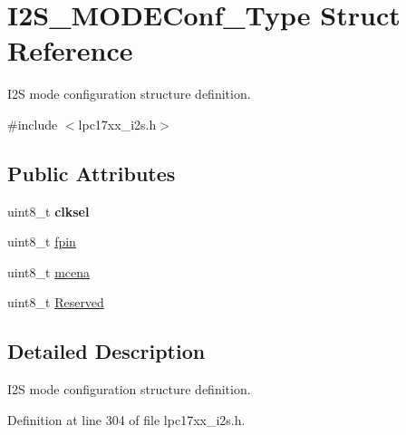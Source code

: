 \hypertarget{struct_i2_s___m_o_d_e_conf___type}{\section{\-I2\-S\-\_\-\-M\-O\-D\-E\-Conf\-\_\-\-Type \-Struct \-Reference}
\label{struct_i2_s___m_o_d_e_conf___type}
}


\-I2\-S mode configuration structure definition.  




{\ttfamily \#include $<$lpc17xx\-\_\-i2s.\-h$>$}

\subsection*{\-Public \-Attributes}
\begin{DoxyCompactItemize}
\item 
\hypertarget{struct_i2_s___m_o_d_e_conf___type_a3f368aed17842afec03e414db9aa68fc}{uint8\-\_\-t {\bfseries clksel}}\label{struct_i2_s___m_o_d_e_conf___type_a3f368aed17842afec03e414db9aa68fc}

\item 
uint8\-\_\-t \hyperlink{struct_i2_s___m_o_d_e_conf___type_a2def5f397a120304356ac08f927c3751}{fpin}
\item 
uint8\-\_\-t \hyperlink{struct_i2_s___m_o_d_e_conf___type_a5b19284e04f77360ba075d068a41a420}{mcena}
\item 
uint8\-\_\-t \hyperlink{struct_i2_s___m_o_d_e_conf___type_abaab05449c36f69dce46351edf867d62}{\-Reserved}
\end{DoxyCompactItemize}


\subsection{\-Detailed \-Description}
\-I2\-S mode configuration structure definition. 

\-Definition at line 304 of file lpc17xx\-\_\-i2s.\-h.



